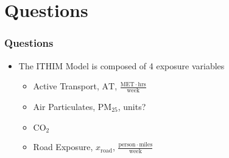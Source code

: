 \documentclass[handout,13pt,compress,c]{beamer}
\newcommand{\bi}{\begin{itemize}}
\newcommand{\ei}{\end{itemize}}
\begin{document}
\section{Questions}
\begin{frame}[fragile]
\frametitle{Questions}
\bi \item The ITHIM Model is composed of 4 exposure variables
\bi \item Active Transport, $\mathrm{AT}$, $\frac{\mathrm{MET}\cdot\mathrm{hrs}}{\mathrm{week}}$
\item Air Particulates, $\mathrm{PM}_{25}$, units?
\item $\textrm{CO}_2$
\item Road Exposure, $x_\mathrm{road}$, $\frac{\mathrm{person}\cdot\mathrm{miles}}{\mathrm{week}}$
\ei\ei
\end{frame}
\end{document}
